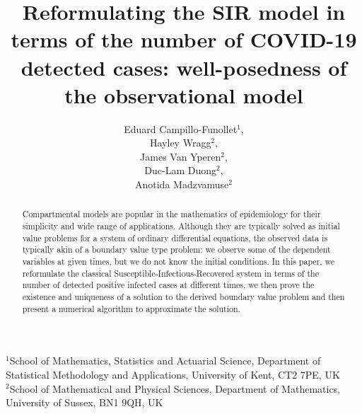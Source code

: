\documentclass{article}
\begin{document}
\title{Reformulating the SIR model in terms of the number of COVID-19 detected cases: well-posedness of the observational model}%
\author{Eduard Campillo-Funollet$^1$, \\Hayley Wragg$^2$, \\James Van Yperen$^2$, \\Duc-Lam Duong$^2$, \\Anotida Madzvamuse$^2$}









\maketitle
\begin{abstract}
    Compartmental models are popular in the mathematics of epidemiology for their simplicity and wide range of applications. Although they are typically solved as initial value problems for a system of ordinary differential equations, the observed data is typically akin of a boundary value type problem: we observe some of the dependent variables at given times, but we do not know the initial conditions. In this paper, we reformulate the classical Susceptible-Infectious-Recovered system in terms of the number of detected positive infected cases at different times, we then prove the existence and uniqueness of a solution to the derived boundary value problem and then present a numerical algorithm to approximate the solution. 
\end{abstract}

{$^1$School of Mathematics, Statistics and Actuarial Science, Department of Statistical Methodology and Applications, University of Kent, CT2 7PE, UK\\ 
$^2$School of Mathematical and Physical Sciences, Department of Mathematics, University of Sussex, BN1 9QH, UK}
\end{document}
